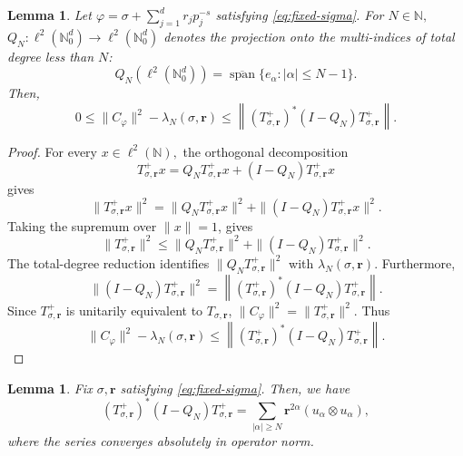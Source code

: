 \documentclass[12pt, reqno]{amsart}
\numberwithin{equation}{section}
\newtheorem{lemma}[theorem]{Lemma}
\begin{document}
\begin{lemma}
\label{lem:finite-prime-total-degree-tail-domination}
Let $\varphi=\sigma+\sum_{j=1}^{d}r_jp_j^{-s}$   satisfying  \eqref{eq:fixed-sigma}. For $N\in\mathbb{N},$  $Q_N:\ell^{2}(\mathbb{N}_{0}^{d})\to\ell^{2}(\mathbb{N}_{0}^{d})$
denotes the projection onto the multi-indices of total degree less than \(N\):
\[
Q_N(\ell^{2}(\mathbb{N}_{0}^{d}))
=
\overline{\operatorname{span}}
\{e_{\alpha}:|\alpha|\leq N-1\}.
\]
Then,
\[
0\leq
\|C_{\varphi}\|^{2}
-
\lambda_N(\sigma,\boldsymbol{r})
\leq
\left\|
(T_{\sigma,\boldsymbol{r}}^{+})^{*}(I-Q_N)T_{\sigma,\boldsymbol{r}}^{+}
\right\|.
\]
\end{lemma}
\begin{proof}
For every $x\in\ell^{2}(\mathbb{N}),$ the orthogonal decomposition
\[
T_{\sigma,\boldsymbol{r}}^{+}x
=
Q_NT_{\sigma,\boldsymbol{r}}^{+}x
+
(I-Q_N)T_{\sigma,\boldsymbol{r}}^{+}x
\]
gives
\[
\|T_{\sigma,\boldsymbol{r}}^{+}x\|^{2}
=
\|Q_NT_{\sigma,\boldsymbol{r}}^{+}x\|^{2}
+
\|(I-Q_N)T_{\sigma,\boldsymbol{r}}^{+}x\|^{2}.
\]
Taking the supremum over $\|x\|=1$, gives
\[
\|T_{\sigma,\boldsymbol{r}}^{+}\|^{2}
\leq
\|Q_NT_{\sigma,\boldsymbol{r}}^{+}\|^{2}
+
\|(I-Q_N)T_{\sigma,\boldsymbol{r}}^{+}\|^{2}.
\]
The total-degree reduction identifies
$\|Q_NT_{\sigma,\boldsymbol{r}}^{+}\|^{2}$ with $\lambda_N(\sigma,\boldsymbol{r}).$ Furthermore,
\[
\|(I-Q_N)T_{\sigma,\boldsymbol{r}}^{+}\|^{2}
=
\left\|
(T_{\sigma,\boldsymbol{r}}^{+})^{*}(I-Q_N)T_{\sigma,\boldsymbol{r}}^{+}
\right\|.
\]
Since $T_{\sigma,\boldsymbol{r}}^{+}$ is unitarily equivalent to  $T_{\sigma,\boldsymbol{r}}$,
$\|C_{\varphi}\|^{2}
= \|T_{\sigma,\boldsymbol{r}}^{+}\|^{2}.$
Thus
\[
\|C_{\varphi}\|^{2}
-
\lambda_N(\sigma,\boldsymbol{r})
\leq
\left\|
(T_{\sigma,\boldsymbol{r}}^{+})^{*}(I-Q_N)T_{\sigma,\boldsymbol{r}}^{+}
\right\|.
\]
\end{proof}
\begin{lemma}
\label{lem:finite-prime-output-tail-rank-one-expansion}
Fix $\sigma,\boldsymbol{r}$ satisfying \eqref{eq:fixed-sigma}. Then, we have
\[
(T_{\sigma,\boldsymbol{r}}^{+})^{*}(I-Q_N)T_{\sigma,\boldsymbol{r}}^{+}
=
\sum_{|\alpha|\geq N}
\boldsymbol{r}^{2\alpha}(u_{\alpha}\otimes u_{\alpha}),
\]
where the series converges absolutely in operator norm.
\end{lemma}
\end{document}
